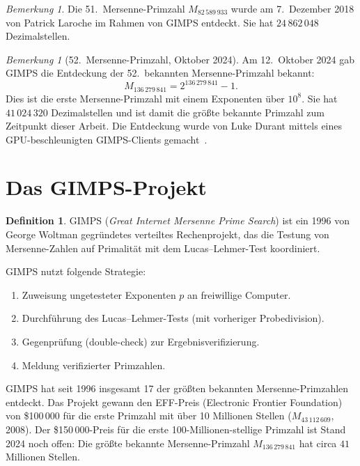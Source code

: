 \documentclass[12pt,a4paper]{amsart}
\theoremstyle{definition}
\newtheorem{definition_de}[theorem]{Definition}
\theoremstyle{remark}
\newtheorem{bemerkung}[theorem]{Bemerkung}
\begin{document}
\begin{bemerkung}
Die 51.\ Mersenne-Primzahl $M_{82\,589\,933}$ wurde am 7.\ Dezember 2018 von
Patrick Laroche im Rahmen von GIMPS entdeckt.
Sie hat $24\,862\,048$ Dezimalstellen.
\end{bemerkung}

\begin{bemerkung}[52.\ Mersenne-Primzahl, Oktober 2024]
\label{bem:52te}
Am 12.\ Oktober 2024 gab GIMPS die Entdeckung der 52.\ bekannten
Mersenne-Primzahl bekannt:
\[
    M_{136\,279\,841} = 2^{136\,279\,841} - 1.
\]
Dies ist die erste Mersenne-Primzahl mit einem Exponenten über $10^8$.
Sie hat $41\,024\,320$ Dezimalstellen und ist damit die größte bekannte
Primzahl zum Zeitpunkt dieser Arbeit.  Die Entdeckung wurde von Luke Durant
mittels eines GPU-beschleunigten GIMPS-Clients gemacht~\cite{GIMPS2024b}.
\end{bemerkung}

\section{Das GIMPS-Projekt}

\begin{definition_de}
GIMPS (\textit{Great Internet Mersenne Prime Search}) ist ein 1996 von George
Woltman gegründetes verteiltes Rechenprojekt, das die Testung von Mersenne-Zahlen
auf Primalität mit dem Lucas--Lehmer-Test koordiniert.
\end{definition_de}

GIMPS nutzt folgende Strategie:
\begin{enumerate}[label=(\arabic*)]
  \item Zuweisung ungetesteter Exponenten $p$ an freiwillige Computer.
  \item Durchführung des Lucas--Lehmer-Tests (mit vorheriger Probedivision).
  \item Gegenprüfung (double-check) zur Ergebnisverifizierung.
  \item Meldung verifizierter Primzahlen.
\end{enumerate}

GIMPS hat seit 1996 insgesamt 17 der größten bekannten Mersenne-Primzahlen
entdeckt. Das Projekt gewann den EFF-Preis (Electronic Frontier Foundation)
von \$100\,000 für die erste Primzahl mit über 10 Millionen Stellen
($M_{43\,112\,609}$, 2008).
Der \$150\,000-Preis für die erste 100-Millionen-stellige Primzahl ist
Stand 2024 noch offen: Die größte bekannte Mersenne-Primzahl $M_{136\,279\,841}$
hat circa $41$ Millionen Stellen.
\end{document}
